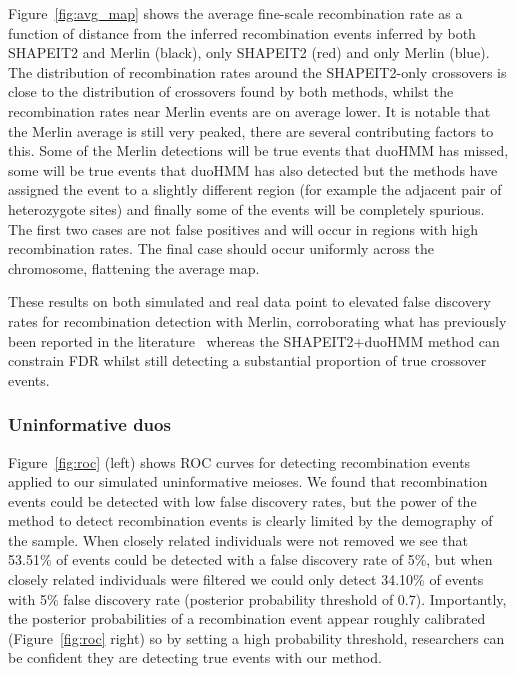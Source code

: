 Figure~\ref{fig:avg_map} shows the average fine-scale recombination rate as a function of distance from the inferred recombination events inferred by both SHAPEIT2 and Merlin (black), only SHAPEIT2 (red) and only Merlin (blue).  The distribution of recombination rates around the SHAPEIT2-only crossovers is close to the distribution of crossovers found by both methods, whilst the recombination rates near Merlin events are on average lower.  It is notable that the Merlin average is still very peaked, there are several contributing factors to this.  Some of the Merlin detections will be true events that duoHMM has missed, some will be true events that duoHMM has also detected but the methods have assigned the event to a slightly different region (for example the adjacent pair of heterozygote sites) and finally some of the events will be completely spurious.  The first two cases are not false positives and will occur in regions with high recombination rates. The final case should occur uniformly across the chromosome, flattening the average map.  

These results on both simulated and real data point to elevated false discovery rates for recombination detection with Merlin, corroborating what has previously been reported in the literature~\citep{coop2008high} whereas the SHAPEIT2+duoHMM method can constrain FDR whilst still detecting a substantial proportion of true crossover events.



\clearpage
\subsubsection{Uninformative duos}
Figure~\ref{fig:roc} (left) shows ROC curves for detecting recombination events applied to our simulated uninformative meioses.  We found that recombination events could be detected with low false discovery rates, but the power of the method to detect recombination events is clearly limited by the demography of the sample.  When closely related individuals were not removed we see that 53.51\% of events could be detected with a false discovery rate  of 5\%, but when closely related individuals were filtered we could only detect 34.10\% of events with 5\% false discovery rate (posterior probability threshold of 0.7).  Importantly, the posterior probabilities of a recombination event appear roughly calibrated (Figure~\ref{fig:roc} right) so by setting a high probability threshold, researchers can be confident they are detecting true events with our method.  

